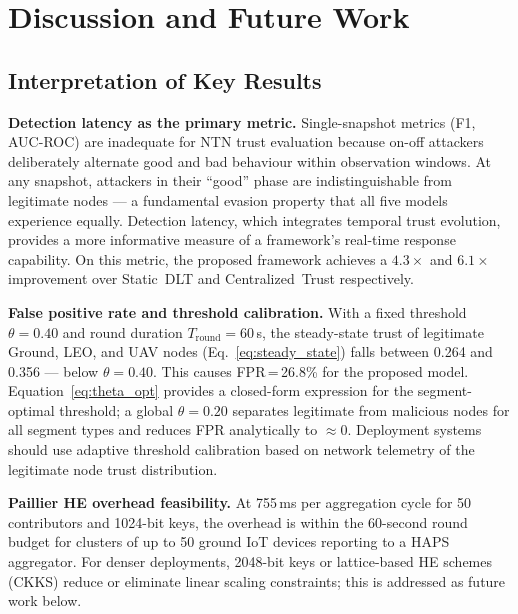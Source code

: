 
\section{Discussion and Future Work}
\label{sec:discussion}

\subsection{Interpretation of Key Results}

\textbf{Detection latency as the primary metric.}
Single-snapshot metrics (F1, AUC-ROC) are inadequate for NTN trust
evaluation because on-off attackers deliberately alternate good and bad
behaviour within observation windows.  At any snapshot, attackers in
their ``good'' phase are indistinguishable from legitimate nodes —
a fundamental evasion property that all five models experience equally.
Detection latency, which integrates temporal trust evolution, provides
a more informative measure of a framework's real-time response
capability.  On this metric, the proposed framework achieves a
$4.3\times$ and $6.1\times$ improvement over Static~DLT and
Centralized~Trust respectively.

\textbf{False positive rate and threshold calibration.}
With a fixed threshold $\theta=0.40$ and round duration
$T_{\mathrm{round}}=60$\,s, the steady-state trust of legitimate
Ground, LEO, and UAV nodes (Eq.~\ref{eq:steady_state}) falls between
0.264 and 0.356 — below $\theta=0.40$.  This causes
FPR\,=\,26.8\% for the proposed model.
Equation~\ref{eq:theta_opt} provides a closed-form expression for the
segment-optimal threshold; a global $\theta=0.20$ separates legitimate
from malicious nodes for all segment types and reduces FPR
analytically to $\approx 0$.  Deployment systems should use adaptive
threshold calibration based on network telemetry of the legitimate
node trust distribution.

\textbf{Paillier HE overhead feasibility.}
At 755\,ms per aggregation cycle for 50 contributors and 1024-bit
keys, the overhead is within the 60-second round budget for clusters
of up to 50 ground IoT devices reporting to a HAPS aggregator.
For denser deployments, 2048-bit keys or lattice-based HE schemes
(CKKS) reduce or eliminate linear scaling constraints; this is
addressed as future work below.

